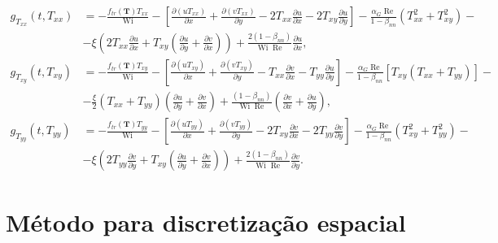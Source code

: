 \begin{subequations}
\begin{align}
    g_{T_{xx}}\left(t, T_{xx}\right) & = - \frac{f_{tr}(\mathbf{T})T_{xx}}{\operatorname{Wi}} - \left[\frac{\partial (uT_{xx})}{\partial x} + \frac{\partial (vT_{xx})}{\partial y} - 2T_{xx}\frac{\partial u}{\partial x} - 2T_{xy}\frac{\partial u}{\partial y}\right] - \frac{\alpha_{G}\operatorname{Re}}{1-\beta_{nn}}\left(T_{xx}^{2} + T_{xy}^{2}\right) - \nonumber \\ & - \xi\left(2T_{xx}\frac{\partial u}{\partial x} + T_{xy}\left(\frac{\partial u}{\partial y} + \frac{\partial v}{\partial x}\right)\right) + \frac{2(1-\beta_{nn})}{\operatorname{Wi}\operatorname{Re}}\frac{\partial u}{\partial x},\label{eq_gies_txx_steps_rk}\\[7mm]
    g_{T_{xy}}\left(t, T_{xy}\right) & = - \frac{f_{tr}(\mathbf{T})T_{xy}}{\operatorname{Wi}} - \left[\frac{\partial (uT_{xy})} {\partial x} + \frac{\partial (vT_{xy})}{\partial y} - T_{xx}\frac{\partial v}{\partial x} - T_{yy}\frac{\partial u}{\partial y}\right] - \frac{\alpha_{G}\operatorname{Re}}{1-\beta_{nn}}\left[T_{xy}\left(T_{xx} + T_{yy}\right)\right] - \nonumber \\ & - \frac{\xi}{2}\left(T_{xx} + T_{yy}\right)\left(\frac{\partial u}{\partial y} + \frac{\partial v}{\partial x}\right) + \frac{(1-\beta_{nn})}{\operatorname{Wi}\operatorname{Re}}\left(\frac{\partial v}{\partial x} + \frac{\partial u}{\partial y}\right),\label{eq_gies_txy_steps_rk}\\[7mm]
    g_{T_{yy}}\left(t, T_{yy}\right) & = - \frac{f_{tr}(\mathbf{T})T_{yy}}{\operatorname{Wi}} - \left[\frac{\partial (uT_{yy})}{\partial x} + \frac{\partial (vT_{yy})}{\partial y} - 2T_{xy}\frac{\partial v}{\partial x} - 2T_{yy}\frac{\partial v}{\partial y}\right] - \frac{\alpha_{G}\operatorname{Re}}{1-\beta_{nn}}\left(T_{xy}^{2} + T_{yy}^{2}\right) - \nonumber \\ & - \xi\left(2T_{yy}\frac{\partial v}{\partial y} + T_{xy}\left(\frac{\partial u}{\partial y} + \frac{\partial v}{\partial x}\right)\right) + \frac{2(1-\beta_{nn})}{\operatorname{Wi}\operatorname{Re}}\frac{\partial v}{\partial y}.\label{eq_gies_tyy_steps_rk}
\end{align}
\end{subequations}

\section{Método para discretização espacial}\label{Sec_Metodos_Numericos_Discretizacao_Espacial}

